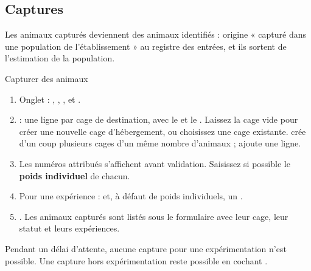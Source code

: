 \documentclass[11pt,a4paper]{article}
\begin{document}
\subsection{Captures}
Les animaux capturés deviennent des animaux identifiés : origine « capturé
dans une population de l'établissement » au registre des entrées, et ils
sortent de l'estimation de la population.
\begin{procedure}{Capturer des animaux}
\begin{enumerate}
  \item Onglet  : , ,
    ,  et .
  \item {} : une ligne par cage de destination, avec
    le  et le . Laissez la cage vide pour
    créer une nouvelle cage d'hébergement, ou choisissez une cage existante.
     crée d'un coup plusieurs cages d'un même
    nombre d'animaux ;  ajoute une ligne.
  \item Les numéros attribués s'affichent avant validation. Saisissez si
    possible le \textbf{poids individuel} de chacun.
  \item Pour une expérience :  et, à
    défaut de poids individuels, un .
  \item {}. Les animaux capturés sont listés sous
    le formulaire avec leur cage, leur statut et leurs expériences.
\end{enumerate}
\end{procedure}
\begin{regle}
Pendant un délai d'attente, aucune capture pour une expérimentation n'est
possible. Une capture hors expérimentation reste possible en cochant
.
\end{regle}
\end{document}
